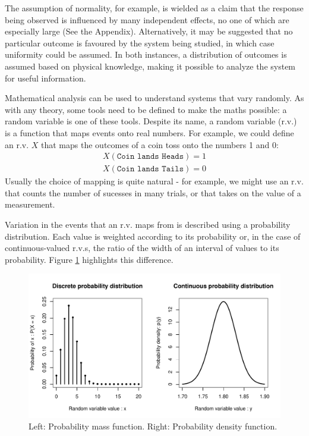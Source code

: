 \documentclass[11pt,a4paper,article]{memoir} %
\begin{document}
  The assumption of normality, for example, is wielded as a claim that the response being observed is influenced by many independent effects, no one of which are especially large (See the Appendix). Alternatively, it may be suggested that no particular outcome is favoured by the system being studied, in which case uniformity could be assumed. In both instances, a distribution of outcomes is assumed based on physical knowledge, making it possible to analyze the system for useful information.
 
Mathematical analysis can be used to understand systems that vary randomly. As with any theory, some tools need to be defined to make the maths possible: a random variable is one of these tools. Despite its name, a random variable (r.v.) is a function that maps events onto real numbers. For example, we could define an r.v. $X$ that maps the outcomes of a coin toss onto the numbers 1 and 0:
 \begin{align}
	X(\texttt{Coin lands Heads}) = 1 \\
	X(\texttt{Coin lands Tails}) =0
 \end{align}
Usually the choice of mapping is quite natural - for example, we might use an r.v. that counts the number of sucesses in many trials, or that takes on the value of a measurement. 
\par
Variation in the events that an r.v. maps from is described using a probability distribution. Each value is weighted according to its probability or, in the case of continuous-valued r.v.s, the ratio of the width of an interval of values to its probability. Figure \ref{fig:example_pd} highlights this difference.
\begin{figure}[h!]
\includegraphics[width=\textwidth]{probability_distributions.pdf}
\caption{Left: Probability mass function. Right: Probability density function.}
\label{fig:example_pd}
\end{figure}
\end{document}
